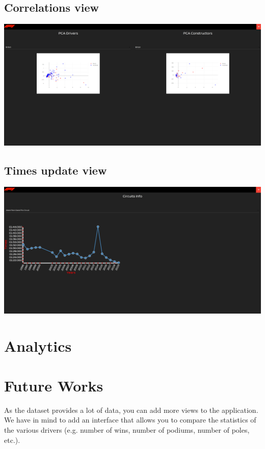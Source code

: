 \documentclass[10pt,twocolumn,letterpaper]{article}
\begin{document}
\subsection{Correlations view}
\begin{center}
	\centering
	\includegraphics[width=\columnwidth]{correlations}
\end{center}

\subsection{Times update view}
\begin{center}
	\centering
	\includegraphics[width=\columnwidth]{timesupdate}
\end{center}


\section{Analytics}


\section{Future Works}
As the dataset provides a lot of data, you can add more views to the application. We have in mind to add an interface that allows you to compare the statistics of the various drivers (e.g. number of wins, number of podiums, number of poles, etc.). 
\end{document}
